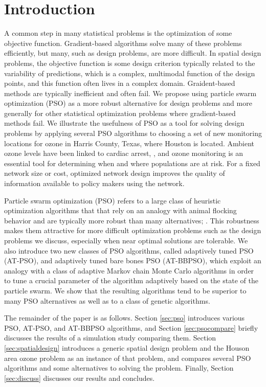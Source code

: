 \documentclass[cmbright]{staauth}
\begin{document}
\section{Introduction}
A common step in many statistical problems is the optimization of some objective function. Gradient-based algorithms solve many of these problems efficiently, but many, such as design problems, are more difficult. In spatial design problems, the objective function is some design criterion typically related to the variability of predictions, which is a complex, multimodal function of the design points, and this function often lives in a complex domain. Graident-based methods are typically inefficient and often fail. We propose using particle swarm optimization (PSO) as a more robust alternative for design problems and more generally for other statistical optimization problems where gradient-based methods fail. We illustrate the usefulness of PSO as a tool for solving design problems by applying several PSO algorithms to choosing a set of new monitoring locations for ozone in Harris County, Texas, where Houston is located. Ambient ozone levels have been linked to cardiac arrest, \cite{ensor2013case}, and ozone monitoring is an essential tool for determining when and where populations are at risk. For a fixed network size or cost, optimized network design improves the quality of information available to policy makers using the network.

Particle swarm optimization (PSO) refers to a large class of heuristic optimization algorithms that that rely on an analogy with animal flocking behavior and are typically more robust than many alternatives; \cite{clerc2002particle,blum2008swarm,clerc2010particle}. This robustness makes them attractive for more difficult optimization problems such as the design problems we discuss, especially when near optimal solutions are tolerable. We also introduce two new classes of PSO algorithms, called adaptively tuned PSO (AT-PSO), and adaptively tuned bare bones PSO (AT-BBPSO), which exploit an analogy with a class of adaptive Markov chain Monte Carlo algorithms in order to tune a crucial parameter of the algorithm adaptively based on the state of the particle swarm. We show that the resulting algorithms tend to be superior to many PSO alternatives as well as to a class of genetic algorithms.

The remainder of the paper is as follows. Section \ref{sec:pso} introduces various PSO, AT-PSO, and AT-BBPSO algorithms, and Section \ref{sec:psocompare} briefly discusses the results of a simulation study comparing them. Section \ref{sec:spatialdesign} introduces a generic spatial design problem and the Houson area ozone problem as an instance of that problem, and compares several PSO algorithms and some alternatives to solving the problem. Finally, Section \ref{sec:discuss} discusses our results and concludes.
\end{document}
